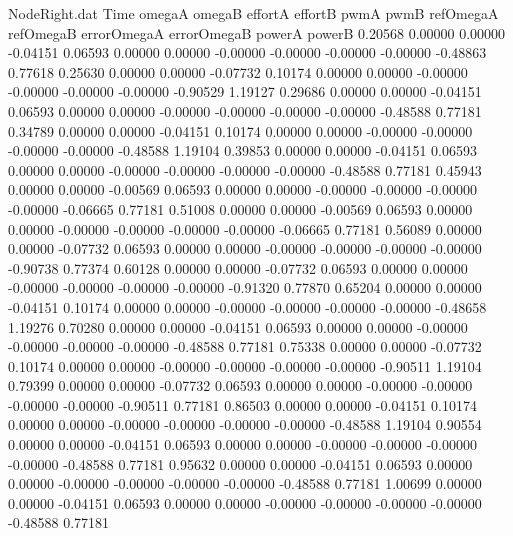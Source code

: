 \begin{filecontents}{NodeRight.dat}
Time omegaA omegaB effortA effortB pwmA pwmB refOmegaA refOmegaB errorOmegaA errorOmegaB powerA powerB
   0.20568    0.00000    0.00000    -0.04151    0.06593    0.00000    0.00000   -0.00000   -0.00000   -0.00000   -0.00000   -0.48863    0.77618
   0.25630    0.00000    0.00000    -0.07732    0.10174    0.00000    0.00000   -0.00000   -0.00000   -0.00000   -0.00000   -0.90529    1.19127
   0.29686    0.00000    0.00000    -0.04151    0.06593    0.00000    0.00000   -0.00000   -0.00000   -0.00000   -0.00000   -0.48588    0.77181
   0.34789    0.00000    0.00000    -0.04151    0.10174    0.00000    0.00000   -0.00000   -0.00000   -0.00000   -0.00000   -0.48588    1.19104
   0.39853    0.00000    0.00000    -0.04151    0.06593    0.00000    0.00000   -0.00000   -0.00000   -0.00000   -0.00000   -0.48588    0.77181
   0.45943    0.00000    0.00000    -0.00569    0.06593    0.00000    0.00000   -0.00000   -0.00000   -0.00000   -0.00000   -0.06665    0.77181
   0.51008    0.00000    0.00000    -0.00569    0.06593    0.00000    0.00000   -0.00000   -0.00000   -0.00000   -0.00000   -0.06665    0.77181
   0.56089    0.00000    0.00000    -0.07732    0.06593    0.00000    0.00000   -0.00000   -0.00000   -0.00000   -0.00000   -0.90738    0.77374
   0.60128    0.00000    0.00000    -0.07732    0.06593    0.00000    0.00000   -0.00000   -0.00000   -0.00000   -0.00000   -0.91320    0.77870
   0.65204    0.00000    0.00000    -0.04151    0.10174    0.00000    0.00000   -0.00000   -0.00000   -0.00000   -0.00000   -0.48658    1.19276
   0.70280    0.00000    0.00000    -0.04151    0.06593    0.00000    0.00000   -0.00000   -0.00000   -0.00000   -0.00000   -0.48588    0.77181
   0.75338    0.00000    0.00000    -0.07732    0.10174    0.00000    0.00000   -0.00000   -0.00000   -0.00000   -0.00000   -0.90511    1.19104
   0.79399    0.00000    0.00000    -0.07732    0.06593    0.00000    0.00000   -0.00000   -0.00000   -0.00000   -0.00000   -0.90511    0.77181
   0.86503    0.00000    0.00000    -0.04151    0.10174    0.00000    0.00000   -0.00000   -0.00000   -0.00000   -0.00000   -0.48588    1.19104
   0.90554    0.00000    0.00000    -0.04151    0.06593    0.00000    0.00000   -0.00000   -0.00000   -0.00000   -0.00000   -0.48588    0.77181
   0.95632    0.00000    0.00000    -0.04151    0.06593    0.00000    0.00000   -0.00000   -0.00000   -0.00000   -0.00000   -0.48588    0.77181
   1.00699    0.00000    0.00000    -0.04151    0.06593    0.00000    0.00000   -0.00000   -0.00000   -0.00000   -0.00000   -0.48588    0.77181

\end{filecontents}

